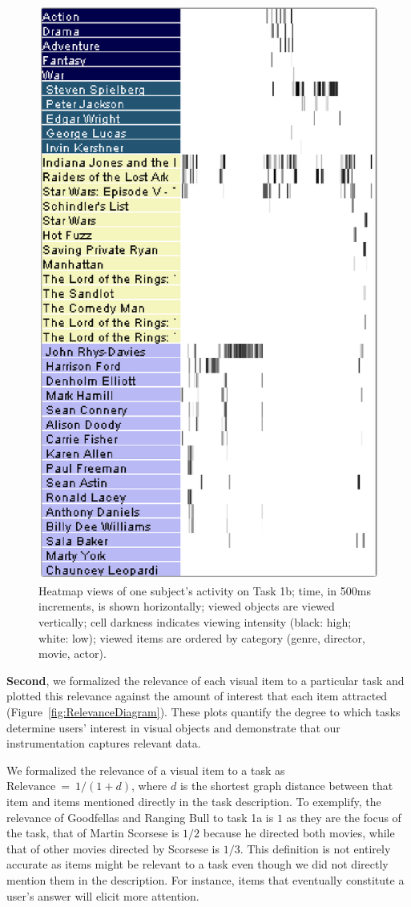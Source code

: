\begin{figure}[!ht]
  \centering
  \includegraphics[width=0.75\linewidth]{images/heatmaps.eps}
  \caption{Heatmap views of one subject's activity on Task 1b; time, in 500ms increments, is shown horizontally; viewed objects are viewed vertically; cell darkness indicates viewing intensity (black: high; white: low); viewed items are ordered by category (genre, director, movie, actor). 
}
	\label{fig:heatmap}
\end{figure}

\vspace{2mm}\noindent
\textbf{Second}, we formalized the relevance of each visual item to a particular task and plotted this relevance against the amount of interest that each item attracted (Figure~\ref{fig:RelevanceDiagram}). These plots quantify the degree to which tasks determine users' interest in visual objects and demonstrate that our instrumentation captures relevant data.    

We formalized the relevance of a visual item to a task as $\text{Relevance}~=~1/(1+d)$, where $d$  is the shortest graph distance between that item and items mentioned directly in the task description.  To exemplify, the relevance of Goodfellas and Ranging Bull to task 1a is $1$ as they are the focus of the task, that of Martin Scorsese is $1/2$  because he directed both movies, while that of other movies directed by Scorsese is $1/3$. This definition is not entirely accurate as items might be relevant to a task even though we did not directly mention them in the description.  For instance, items that eventually constitute a user's answer will elicit more attention. 

